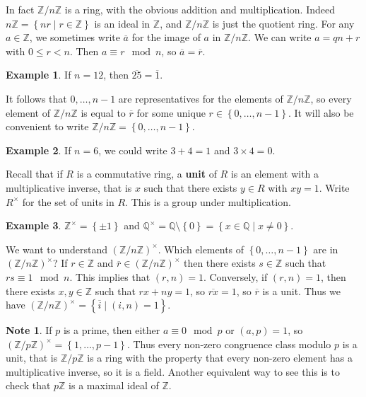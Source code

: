\documentclass{article}
\newcommand{\Z}{\mathbb{Z}}
\newcommand{\Q}{\mathbb{Q}}
\newcommand{\rb}[1]{\left( #1 \right)}
\newcommand{\cb}[1]{\left\{ #1 \right\}}
\newcommand{\unit}[1]{\rb{\Z / #1\Z}^\times}
\theoremstyle{definition}\newtheorem{definition}{Definition}
\theoremstyle{definition}\newtheorem*{remark}{Remark}
\theoremstyle{definition}\newtheorem*{example}{Example}
\theoremstyle{definition}\newtheorem*{note}{Note}
\begin{document}
In fact $ \Z / n\Z $ is a ring, with the obvious addition and multiplication. Indeed $ n\Z = \cb{nr \mid r \in \Z} $ is an ideal in $ \Z $, and $ \Z / n\Z $ is just the quotient ring. For any $ a \in \Z $, we sometimes write $ \overline{a} $ for the image of $ a $ in $ \Z / n\Z $. We can write $ a = qn + r $ with $ 0 \le r < n $. Then $ a \equiv r \mod n $, so $ \overline{a} = \overline{r} $.

\begin{example}
If $ n = 12 $, then $ \overline{25} = \overline{1} $.
\end{example}

It follows that $ 0, \dots, n - 1 $ are representatives for the elements of $ \Z / n\Z $, so every element of $ \Z / n\Z $ is equal to $ \overline{r} $ for some unique $ r \in \cb{0, \dots, n - 1} $. It will also be convenient to write $ \Z / n\Z = \cb{0, \dots, n - 1} $.

\begin{example}
If $ n = 6 $, we could write $ 3 + 4 = 1 $ and $ 3 \times 4 = 0 $.
\end{example}

Recall that if $ R $ is a commutative ring, a \textbf{unit} of $ R $ is an element with a multiplicative inverse, that is $ x $ such that there exists $ y \in R $ with $ xy = 1 $. Write $ R^\times $ for the set of units in $ R $. This is a group under multiplication.

\begin{example}
$ \Z^\times = \cb{\pm 1} $ and $ \Q^\times = \Q \setminus \cb{0} = \cb{x \in \Q \mid x \ne 0} $.
\end{example}

We want to understand $ \unit{n} $. Which elements of $ \cb{0, \dots, n - 1} $ are in $ \unit{n} $? If $ r \in \Z $ and $ \overline{r} \in \unit{n} $ then there exists $ s \in \Z $ such that $ rs \equiv 1 \mod n $. This implies that $ \rb{r, n} = 1 $. Conversely, if $ \rb{r, n} = 1 $, then there exists $ x, y \in \Z $ such that $ rx + ny = 1 $, so $ \overline{rx} = 1 $, so $ \overline{r} $ is a unit. Thus we have $ \unit{n} = \cb{\overline{i} \mid \rb{i, n} = 1} $.

\begin{note}
If $ p $ is a prime, then either $ a \equiv 0 \mod p $ or $ \rb{a, p} = 1 $, so $ \unit{p} = \cb{1, \dots, p - 1} $. Thus every non-zero congruence class modulo $ p $ is a unit, that is $ \Z / p\Z $ is a ring with the property that every non-zero element has a multiplicative inverse, so it is a field. Another equivalent way to see this is to check that $ p\Z $ is a maximal ideal of $ \Z $.
\end{note}
\end{document}
